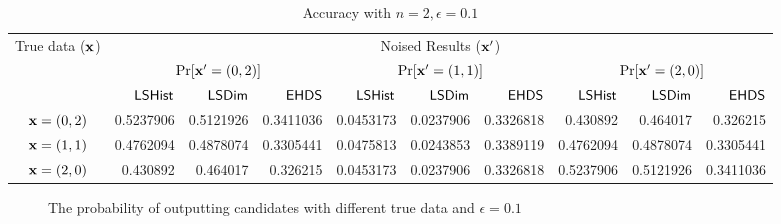 \documentclass{article}
\begin{document}
\begin{table}[htbp]
	\tiny
	\centering
	\caption{Accuracy with $n = 2, \epsilon = 0.1$}
	\label{tab_n2eps0.1prob}
\begin{tabular}{|c||r|r|r|r|r|r|r|r|r|}
	\hline
	\multirow{3}{*}{True data ($\textbf{x}$)}
								&  \multicolumn{9}{c|}{Noised Results ($\textbf{x}'$)}
								\\ \cline{2-10}
	                      		&  \multicolumn{3}{c|}{$\Pr[\textbf{x}' = (0, 2)]$}  	
	                      		&  \multicolumn{3}{c|}{$\Pr[\textbf{x}' = (1, 1)]$} 	
	                      		&  \multicolumn{3}{c|}{$\Pr[\textbf{x}' = (2, 0)]$} 	\\
	                      		\cline{2-10}
						        & $\mathsf{LSHist}$	
								& $\mathsf{LSDim}$
								& $\mathsf{EHDS}$
								& $\mathsf{LSHist}$
								& $\mathsf{LSDim}$	
								& $\mathsf{EHDS}$
								& $\mathsf{LSHist}$
								& $\mathsf{LSDim}$
								& $\mathsf{EHDS}$\\
	                      		\hline \hline
	$\textbf{x} = (0,2)$          & 0.5237906	
								& 0.5121926	
								& 0.3411036
								& 0.0453173
								& 0.0237906
								& 0.3326818
								& 0.430892
								& 0.464017
								& 0.326215
								\\  \hline
	$\textbf{x} = (1,1)$          & 0.4762094
								& 0.4878074
								& 0.3305441
								& 0.0475813
								& 0.0243853
								& 0.3389119 
								& 0.4762094
								& 0.4878074	
								& 0.3305441	
								\\  \hline
	$\textbf{x} = (2,0)$          & 0.430892
								& 0.464017
								& 0.326215
								& 0.0453173
								& 0.0237906
								& 0.3326818 
								& 0.5237906	
								& 0.5121926	
								& 0.3411036
								\\  \hline
\end{tabular}
\end{table}

\begin{figure*}[ht]
\begin{center}
\vspace{-0.5cm}
     \centering
      \caption{\footnotesize The probability of outputting candidates with different true data and $\epsilon = 0.1$}
\vspace{-0.5cm}
\end{center}
\end{figure*}
\end{document}
